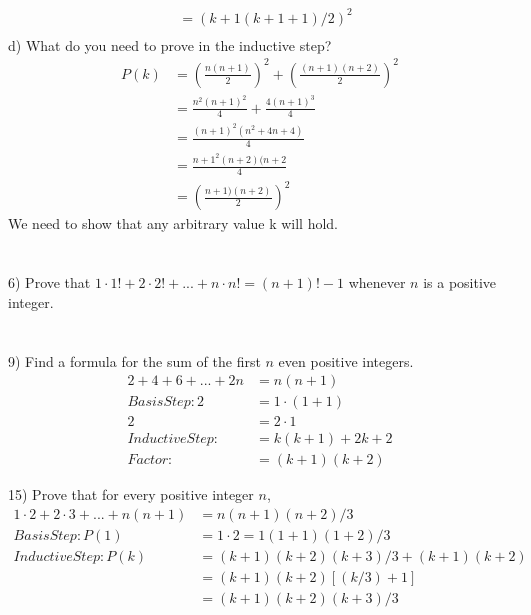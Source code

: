 \documentclass{article}
\begin{document}
\begin{flushleft}
\begin{align*}
&= (k+1(k+1 + 1)/2)^2\\
\end{align*}
\setlength\parindent{0pt}d) What do you need to prove in the inductive step? \\
\begin{align*}
P(k) &= (\frac{n(n+1)}{2})^2 + (\frac{(n+1)(n+2)}{2})^2 \\
&= \frac{n^2(n+1)^2}{4} + \frac{4(n+1)^3}{4} \\
&= \frac{(n+1)^2(n^2 + 4n + 4)}{4}\\
&= \frac{n+1^2(n+2)(n+2}{4} \\
&= (\frac{n+1)(n+2)}{2})^2
\end{align*}
\setlength\parindent{24pt}We need to show that any arbitrary value k will hold. \\

~\\

~\\

\setlength\parindent{0pt}6) Prove that $1 \cdot 1! + 2 \cdot 2! + ... + n \cdot n! = (n+1)! - 1$ whenever $n$ is a positive integer. \\
~\\
~\\
\setlength\parindent{0pt}9) Find a formula for the sum of the first $n$ even positive integers. \\
\begin{align*}
2 + 4 + 6 + ... + 2n &= n(n+1)\\
Basis Step: 2 &= 1 \cdot (1+1)\\
2 &= 2 \cdot 1 \\
Inductive Step: &= k(k+1) +  2k + 2 \\
Factor: &= (k+1)(k+2)
\end{align*}

\setlength\parindent{0pt}15) Prove that for every positive integer $n$, \\
\begin{align*}
1 \cdot 2 + 2 \cdot 3 + ... + n(n+1) &= n(n+1)(n+2)/3 \\
Basis Step: P(1) &= 1 \cdot 2 = 1(1+1)(1+2)/3 \\
Inductive Step: P(k) &= (k+1)(k+2)(k+3)/3 + (k+1)(k+2) \\
&= (k+1)(k+2)[(k/3)+1] \\
&= (k+1)(k+2)(k+3)/3
\end{align*}


\end{flushleft}
\end{document}
